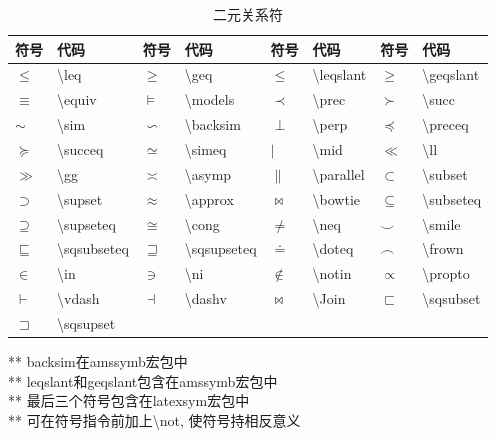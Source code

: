 \documentclass[UTF8,fontset=ubuntu]{ctexart}
\begin{document}
\begin{table}[H]
\begin{tabular}{l l l l l l l l}
    \hline
    符号 & 代码 & 符号 & 代码 & 符号 & 代码 & 符号 & 代码\\\hline
    $\leq$ & \textbackslash leq & $\geq$ & \textbackslash geq & $\leqslant$ & \textbackslash leqslant & $\geqslant$ & \textbackslash geqslant\\
    $\equiv$ & \textbackslash equiv & $\models$ & \textbackslash models & $\prec$ & \textbackslash prec & $\succ$ & \textbackslash succ\\
    $\sim$ & \textbackslash sim & $\backsim$ & \textbackslash backsim & $\perp$ & \textbackslash perp & $\preceq$ & \textbackslash preceq\\
    $\succeq$ & \textbackslash succeq & $\simeq$ & \textbackslash simeq & $\mid$ & \textbackslash mid & $\ll$ & \textbackslash ll\\
    $\gg$ & \textbackslash gg & $\asymp$ & \textbackslash asymp & $\parallel$ & \textbackslash parallel & $\subset$ & \textbackslash subset\\
    $\supset$ & \textbackslash supset & $\approx$ & \textbackslash approx & $\bowtie$ & \textbackslash bowtie & $\subseteq$ & \textbackslash subseteq\\
    $\supseteq$ & \textbackslash supseteq & $\cong$ & \textbackslash cong & $\neq$ & \textbackslash neq & $\smile$ & \textbackslash smile\\
    $\sqsubseteq$ & \textbackslash sqsubseteq & $\sqsupseteq$ & \textbackslash sqsupseteq & $\doteq$ & \textbackslash doteq & $\frown$ & \textbackslash frown\\
    $\in$ & \textbackslash in & $\ni$ & \textbackslash ni & $\notin$ & \textbackslash notin & $\propto$ & \textbackslash propto\\
    $\vdash$ & \textbackslash vdash & $\dashv$ & \textbackslash dashv & $\Join$ & \textbackslash Join & $\sqsubset$ & \textbackslash sqsubset\\
    $\sqsupset$ & \textbackslash sqsupset\\
    \hline
\end{tabular}
** backsim在amssymb宏包中\\
** leqslant和geqslant包含在amssymb宏包中\\
** 最后三个符号包含在latexsym宏包中\\
** 可在符号指令前加上\textbackslash not, 使符号持相反意义
\caption{二元关系符}
\end{table}
\end{document}
